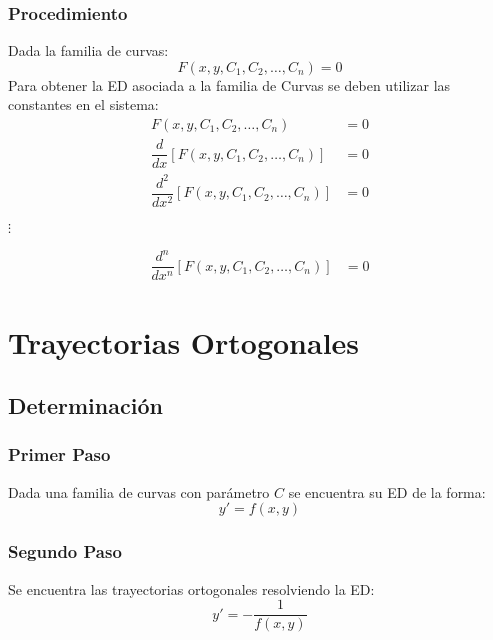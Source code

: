 \subsubsection{Procedimiento}
Dada la familia de curvas:
$$F(x,y,C_1,C_2,\ldots,C_n)=0$$
Para obtener la ED asociada a la familia de Curvas se deben utilizar las constantes en el sistema:
\begin{align*}
F(x,y,C_1,C_2,\ldots,C_n) & = 0 \\
\dfrac{d}{dx}\left[ F(x,y,C_1,C_2,\ldots,C_n)\right]  & = 0 \\
\dfrac{d^2}{dx^2}\left[ F(x,y,C_1,C_2,\ldots,C_n)\right]  & = 0 
\end{align*}
\begin{center}
$\vdots $
\end{center}
\begin{align*}
\dfrac{d^n}{dx^n}\left[ F(x,y,C_1,C_2,\ldots,C_n)\right]  & = 0 
\end{align*}
\section{Trayectorias Ortogonales}
\subsection{Determinación}
\subsubsection{Primer Paso}
Dada una familia de curvas con parámetro $C$ se encuentra su ED de la forma:
$$y'=f(x,y)$$
\subsubsection{Segundo Paso}
Se encuentra las trayectorias ortogonales resolviendo la ED:
$$y' = -\dfrac{1}{f(x,y)}$$